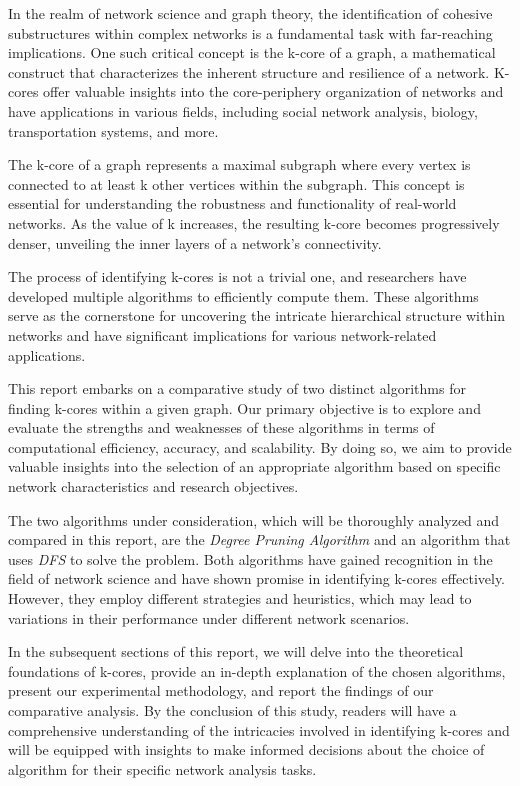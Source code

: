 \label{sec:Introduction}

In the realm of network science and graph theory, the identification of cohesive substructures within complex networks is a fundamental task with far-reaching implications. One such critical concept is the k-core of a graph, a mathematical construct that characterizes the inherent structure and resilience of a network. K-cores offer valuable insights into the core-periphery organization of networks and have applications in various fields, including social network analysis, biology, transportation systems, and more.

The k-core of a graph represents a maximal subgraph where every vertex is connected to at least k other vertices within the subgraph. This concept is essential for understanding the robustness and functionality of real-world networks. As the value of k increases, the resulting k-core becomes progressively denser, unveiling the inner layers of a network's connectivity.

The process of identifying k-cores is not a trivial one, and researchers have developed multiple algorithms to efficiently compute them. These algorithms serve as the cornerstone for uncovering the intricate hierarchical structure within networks and have significant implications for various network-related applications.

This report embarks on a comparative study of two distinct algorithms for finding k-cores within a given graph. Our primary objective is to explore and evaluate the strengths and weaknesses of these algorithms in terms of computational efficiency, accuracy, and scalability. By doing so, we aim to provide valuable insights into the selection of an appropriate algorithm based on specific network characteristics and research objectives.

The two algorithms under consideration, which will be thoroughly analyzed and compared in this report, are the \textit{Degree Pruning Algorithm} and an algorithm that uses \textit{DFS} to solve the problem. Both algorithms have gained recognition in the field of network science and have shown promise in identifying k-cores effectively. However, they employ different strategies and heuristics, which may lead to variations in their performance under different network scenarios.

In the subsequent sections of this report, we will delve into the theoretical foundations of k-cores, provide an in-depth explanation of the chosen algorithms, present our experimental methodology, and report the findings of our comparative analysis. By the conclusion of this study, readers will have a comprehensive understanding of the intricacies involved in identifying k-cores and will be equipped with insights to make informed decisions about the choice of algorithm for their specific network analysis tasks.
